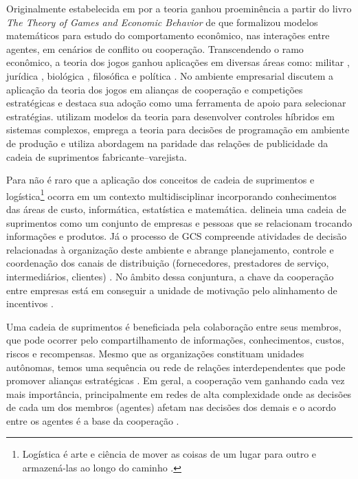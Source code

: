 \documentclass[
	article,			        %
	11pt,				          %
	oneside,			        %
	a4paper,			        %
	english,			        %
	brazil,				        %
	sumario=tradicional
]{abntex2}\usepackage[]{graphicx}\usepackage[]{color}
\begin{document}
Originalmente estabelecida em \citeyear{Cournot.1838} por  a teoria ganhou proeminência a partir do livro \emph{The Theory of Games and Economic Behavior} de  que formalizou modelos matemáticos para estudo do comportamento econômico, nas interações entre agentes, em cenários de conflito ou cooperação. Transcendendo o ramo econômico, a teoria dos jogos ganhou aplicações em diversas áreas como: militar \cite{Haywood.1954,RAND.2004}, jurídica \cite{Rosa.2014}, biológica \cite{Smith.1982}, filosófica \cite{Lewis.2002} e política \cite{Levy.2003}. No ambiente empresarial  discutem a aplicação da teoria dos jogos em alianças de cooperação e competições estratégicas e  destaca sua adoção como uma ferramenta de apoio para selecionar estratégias.  utilizam modelos da teoria para desenvolver controles híbridos em sistemas complexos,  emprega a teoria para decisões de programação em ambiente de produção e  utiliza abordagem na paridade das relações de publicidade da cadeia de suprimentos fabricante--varejista.

Para  não é raro que a aplicação dos conceitos de cadeia de suprimentos e logística\footnote{Logística é arte e ciência de mover as coisas de um lugar para outro e armazená-las ao longo do caminho \cite[p.~370]{Fawcett.2000}.} ocorra em um contexto multidisciplinar incorporando conhecimentos das áreas de custo, informática, estatística e matemática.  delineia uma cadeia de suprimentos como um conjunto de empresas e pessoas que se relacionam trocando informações e produtos. Já o processo de GCS compreende atividades de decisão relacionadas à organização deste ambiente \cite{Fredendall.2001} e abrange planejamento, controle e coordenação dos canais de distribuição (fornecedores, prestadores de serviço, intermediários, clientes) \cite{Panitz.2007}. No âmbito dessa conjuntura, a chave da cooperação entre empresas está em conseguir a unidade de motivação pelo alinhamento de incentivos \cite{Cao.2012}. 

Uma cadeia de suprimentos é beneficiada pela colaboração entre seus membros, que pode ocorrer pelo compartilhamento de informações, conhecimentos, custos, riscos e recompensas. Mesmo que as organizações constituam unidades autônomas, temos uma sequência ou rede de relações interdependentes que pode promover alianças estratégicas \cite{Chen.2004}. Em geral, a cooperação vem ganhando cada vez mais importância, principalmente em redes de alta complexidade \cite{Drechsel.2010} onde as decisões de cada um dos membros (agentes) afetam nas decisões dos demais e o acordo entre os agentes é a base da cooperação \cite{Young.1994}.
\end{document}
